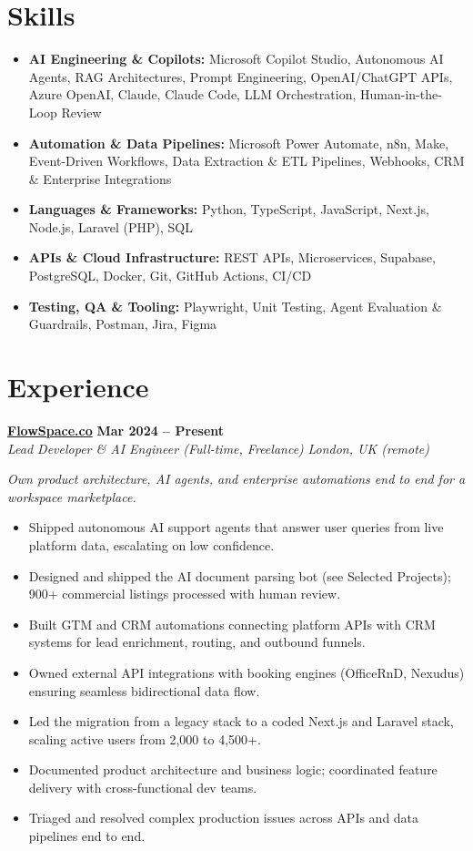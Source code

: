 \documentclass[a4paper,10pt]{article}
\newcommand{\role}[4]{%
 \textbf{#1} \hfill \textbf{#2}\\[1pt]%
 \textit{#3} \hfill \textit{#4}\par\vspace{2pt}%
}
\begin{document}
\section{Skills}
\begin{itemize}
 \item \textbf{AI Engineering \& Copilots:} Microsoft Copilot Studio, Autonomous AI Agents, RAG Architectures, Prompt Engineering, OpenAI/ChatGPT APIs, Azure OpenAI, Claude, Claude Code, LLM Orchestration, Human-in-the-Loop Review
 \item \textbf{Automation \& Data Pipelines:} Microsoft Power Automate, n8n, Make, Event-Driven Workflows, Data Extraction \& ETL Pipelines, Webhooks, CRM \& Enterprise Integrations
 \item \textbf{Languages \& Frameworks:} Python, TypeScript, JavaScript, Next.js, Node.js, Laravel (PHP), SQL
 \item \textbf{APIs \& Cloud Infrastructure:} REST APIs, Microservices, Supabase, PostgreSQL, Docker, Git, GitHub Actions, CI/CD
 \item \textbf{Testing, QA \& Tooling:} Playwright, Unit Testing, Agent Evaluation \& Guardrails, Postman, Jira, Figma
\end{itemize}

\section{Experience}

\role{\href{https://flowspace.co}{FlowSpace.co}}{Mar 2024 -- Present}{Lead Developer \& AI Engineer (Full-time, Freelance)}{London, UK (remote)}
\textit{Own product architecture, AI agents, and enterprise automations end to end for a workspace marketplace.}
\begin{itemize}
 \item Shipped autonomous AI support agents that answer user queries from live platform data, escalating on low confidence.
 \item Designed and shipped the AI document parsing bot (see Selected Projects); 900+ commercial listings processed with human review.
 \item Built GTM and CRM automations connecting platform APIs with CRM systems for lead enrichment, routing, and outbound funnels.
 \item Owned external API integrations with booking engines (OfficeRnD, Nexudus) ensuring seamless bidirectional data flow.
 \item Led the migration from a legacy stack to a coded Next.js and Laravel stack, scaling active users from 2,000 to 4,500+.
 \item Documented product architecture and business logic; coordinated feature delivery with cross-functional dev teams.
 \item Triaged and resolved complex production issues across APIs and data pipelines end to end.
\end{itemize}
\end{document}
